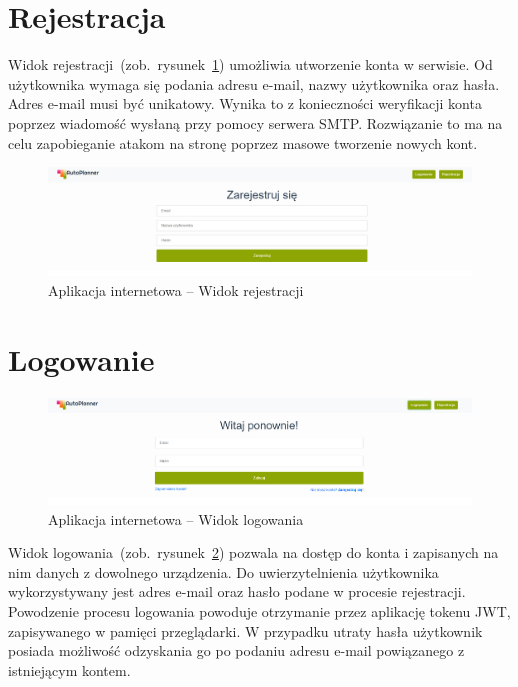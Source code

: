 \section{Rejestracja}
Widok rejestracji~(zob.~rysunek~\ref{rys:register}) umożliwia utworzenie konta w serwisie. Od użytkownika wymaga się podania adresu e-mail, nazwy użytkownika oraz hasła. Adres e-mail musi być unikatowy. Wynika to z konieczności weryfikacji konta poprzez wiadomość wysłaną przy pomocy serwera SMTP. Rozwiązanie to ma na celu zapobieganie atakom na stronę poprzez masowe tworzenie nowych kont. 
\begin{figure}[!ht]
\centering\includegraphics[width=\textwidth]{figures/register}
\caption{Aplikacja internetowa -- Widok rejestracji}\label{rys:register}
\end{figure}
\section{Logowanie}
\begin{figure}[!ht]
\centering\includegraphics[width=\textwidth]{figures/login}
\caption{Aplikacja internetowa -- Widok logowania}\label{rys:login}
\end{figure}
Widok logowania~(zob.~rysunek~\ref{rys:login}) pozwala na dostęp do konta i zapisanych na nim danych z dowolnego urządzenia. Do uwierzytelnienia użytkownika wykorzystywany jest adres e-mail oraz hasło podane w procesie rejestracji. Powodzenie procesu logowania powoduje otrzymanie przez aplikację tokenu JWT, zapisywanego w pamięci przeglądarki. W przypadku utraty hasła użytkownik posiada możliwość odzyskania go po podaniu adresu e-mail powiązanego z istniejącym kontem.
